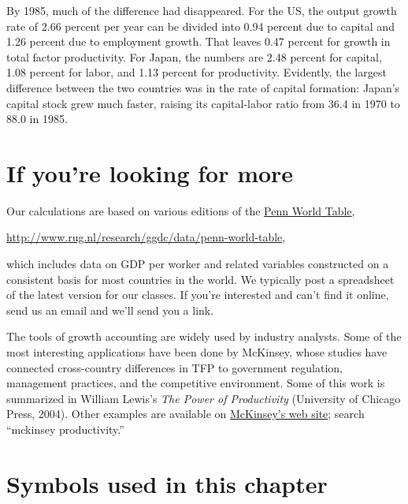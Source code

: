 \begin{enumerate}
By 1985, much of the difference had disappeared.
For the US, the output growth rate of 2.66 percent per year can be divided
into 0.94 percent due to capital and 1.26 percent due to employment growth.
That leaves 0.47 percent for growth in total factor productivity.
For Japan, the numbers are 2.48 percent for capital, 1.08 percent for
labor, and 1.13 percent for productivity.
Evidently, the largest difference between the two
countries was in the rate of capital formation:  Japan's capital stock
grew much faster, raising its capital-labor ratio from
36.4 in 1970 to 88.0 in 1985.
\end{enumerate}
\setlength{\leftmargini}{\oldleftmargini}

\section*{If you're looking for more}

Our calculations are based on various editions of the
\href{http://www.rug.nl/research/ggdc/data/penn-world-table}{Penn World Table},

\vspace*{\parskip}
\centerline{\url{http://www.rug.nl/research/ggdc/data/penn-world-table},}

which includes data on GDP per worker and related variables constructed
on a consistent basis for most countries in the world.
We typically post a spreadsheet of the latest version for our classes.
If you're interested and can't find it online,
send us an email and we'll send you a link.

The tools of growth accounting are widely used by industry analysts.
Some of the most interesting applications have been done by McKinsey,
whose studies have connected cross-country differences in TFP to
government regulation, management practices, and the competitive environment.
Some of this work is summarized in William Lewis's
{\it The Power of Productivity\/}
(University of Chicago Press, 2004).
Other examples are available on \href{http://www.mckinsey.com/insights/mgi/research/productivity_competitiveness_and_growth}{McKinsey's web site};
search ``mckinsey productivity.''

\section*{Symbols used in this chapter}

